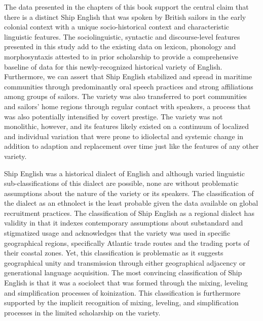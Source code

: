 The data presented in the chapters of this book support the central claim that there is a distinct Ship English that was spoken by British sailors in the early colonial context with a unique socio-historical context and characteristic linguistic features. The sociolinguistic, syntactic and discourse-level features presented in this study add to the existing data on lexicon, phonology and morphosyntaxis attested to in prior scholarship to provide a comprehensive baseline of data for this newly-recognized historical variety of English. Furthermore, we can assert that Ship English stabilized and spread in maritime communities through predominantly oral speech practices and strong affiliations among groups of sailors. The variety was also transferred to port communities and sailors’ home regions through regular contact with speakers, a process that was also potentially intensified by covert prestige. The variety was not monolithic, however, and its features likely existed on a continuum of localized and individual variation that were prone to idiolectal and systemic change in addition to adaption and replacement over time just like the features of any other variety. 

Ship English was a historical dialect of English and although varied linguistic sub-classifications of this dialect are possible, none are without problematic assumptions about the nature of the variety or its speakers. The classification of the dialect as an ethnolect is the least probable given the data available on global recruitment practices. The classification of Ship English as a regional dialect has validity in that it indexes contemporary assumptions about {substandard and stigmatized usage and acknowledges that the variety was used in specific geographical regions, specifically Atlantic trade routes} and the trading ports of their coastal zones. {Yet, this classification} is problematic{ as it suggests} geographical unity and transmission through either geographical adjacency or generational language acquisition. The most convincing classification of Ship English is that it was a sociolect that was formed through the mixing, leveling and simplification processes of koinization. This classification is furthermore supported by the implicit recognition of mixing, leveling, and simplification processes in the limited scholarship on the variety.

